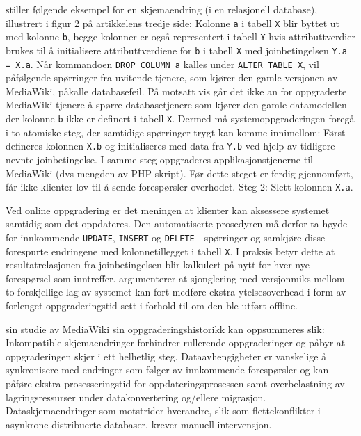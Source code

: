 \cite{dumitras2009nodowntime} stiller følgende eksempel for en skjemaendring (i en relasjonell database), illustrert i figur 2 på artikkelens tredje side: Kolonne \texttt{a} i tabell \texttt{X} blir byttet ut med kolonne \texttt{b}, begge kolonner er også representert i tabell \texttt{Y} hvis attributtverdier brukes til å initialisere attributtverdiene for \texttt{b} i tabell \texttt{X} med joinbetingelsen \texttt{Y.a = X.a}. Når kommandoen \texttt{DROP COLUMN a} kalles under \texttt{ALTER TABLE X}, vil påfølgende spørringer fra uvitende tjenere, som kjører den gamle versjonen av MediaWiki, påkalle databasefeil. På motsatt vis går det ikke an for oppgraderte MediaWiki-tjenere å spørre databasetjenere som kjører den gamle datamodellen der kolonne \texttt{b} ikke er definert i tabell \texttt{X}. Dermed må systemoppgraderingen foregå i to atomiske steg, der samtidige spørringer trygt kan komme innimellom: Først defineres kolonnen \texttt{X.b} og initialiseres med data fra \texttt{Y.b} ved hjelp av tidligere nevnte joinbetingelse. I samme steg oppgraderes applikasjonstjenerne til MediaWiki (dvs mengden av PHP-skript). Før dette steget er ferdig gjennomført, får ikke klienter lov til å sende forespørsler overhodet. Steg 2: Slett kolonnen \texttt{X.a}.

Ved online oppgradering er det meningen at klienter kan aksessere systemet samtidig som det oppdateres. Den automatiserte prosedyren må derfor ta høyde for innkommende \texttt{UPDATE}, \texttt{INSERT} og \texttt{DELETE} - spørringer og samkjøre disse forespurte endringene med kolonnetillegget i tabell \texttt{X}. I praksis betyr dette at resultatrelasjonen fra joinbetingelsen blir kalkulert på nytt for hver nye forespørsel som inntreffer. \cite{dumitras2009nodowntime} argumenterer at sjonglering med versjonmiks mellom to forskjellige lag av systemet kan fort medføre ekstra ytelsesoverhead i form av forlenget oppgraderingstid sett i forhold til om den ble utført offline.

\cite{dumitras2009nodowntime} sin studie av MediaWiki sin oppgraderingshistorikk kan oppsummeres slik: Inkompatible skjemaendringer forhindrer rullerende oppgraderinger og påbyr at oppgraderingen skjer i ett helhetlig steg. Dataavhengigheter er vanskelige å synkronisere med endringer som følger av innkommende forespørsler og kan påføre ekstra prosesseringstid for oppdateringsprosessen samt overbelastning av lagringsressurser under datakonvertering og/ellere migrasjon. Dataskjemaendringer som motstrider hverandre, slik som flettekonflikter i asynkrone distribuerte databaser, krever manuell intervensjon.

